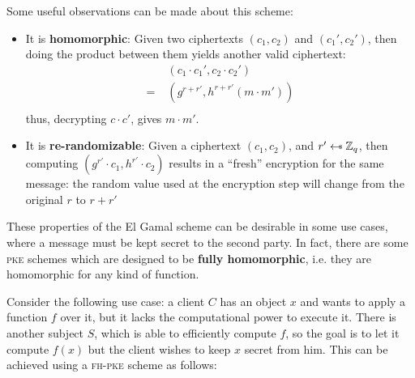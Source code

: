 Some useful observations can be made about this scheme:
\begin{itemize}
    \item It is \textbf{homomorphic}: Given two ciphertexts $(c_1, c_2)$ and $(c_1', c_2')$, then doing the product between them yields another valid ciphertext:
    \begin{align*}
        & (c_1\cdot c_1', c_2\cdot c_2') \\
        =\;& (g^{r+r'}, h^{r+r'}(m\cdot m')) \\
    \end{align*}
    thus, decrypting $c\cdot c'$, gives $m\cdot m'$.

    \item It is \textbf{re-randomizable}: Given a ciphertext $(c_1, c_2)$, and $r' \pickUAR \mathbb{Z}_q$, then computing $(g^{r'}\cdot c_1, h^{r'}\cdot c_2)$ results in a ``fresh'' encryption for the same message: the random value used at the encryption step will change from the original $r$ to $r+r'$
\end{itemize}

These properties of the El Gamal scheme can be desirable in some use cases, where a message must be kept secret to the second party. In fact, there are some \textsc{pke} schemes which are designed to be \textbf{fully homomorphic}, i.e. they are homomorphic for any kind of function.

Consider the following use case: a client $C$ has an object $x$ and wants to apply a function $f$ over it, but it lacks the computational power to execute it. There is another subject $S$, which is able to efficiently compute $f$, so the goal is to let it compute $f(x)$ but the client wishes to keep $x$ secret from him. This can be achieved using a \textsc{fh-pke} scheme as follows:


